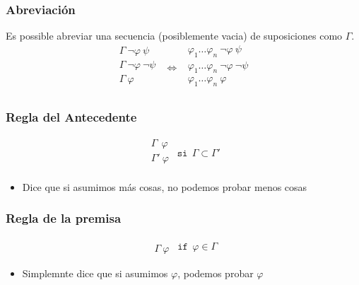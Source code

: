 \documentclass{beamer}
\begin{document}
\begin{frame}
    \frametitle{Abreviaci\'on}
    Es possible abreviar una secuencia (posiblemente vacia) de suposiciones
    como $\Gamma$.\\
    \[
        \begin{array}{l}
            \Gamma\ \neg\varphi\ \psi \\
            \Gamma\ \neg\varphi\ \neg\psi \\
            \hline
            \Gamma\ \varphi \\
        \end{array}
        \ \ \Leftrightarrow\ \ 
        \begin{array}{l}
            \varphi_{1}\ldots\varphi_{n}\ \neg\varphi\ \psi \\
            \varphi_{1}\ldots\varphi_{n}\ \neg\varphi\ \neg\psi \\
            \hline
            \varphi_{1}\ldots\varphi_{n}\ \varphi \\
        \end{array}
    \]
\end{frame}


\begin{frame}
    \frametitle{Regla del Antecedente}
    \[
        \begin{array}{l}
            \Gamma\ \ \varphi \\
            \hline
            \Gamma'\ \varphi \\
        \end{array}
        \ \ \mathtt{si}\ \  \Gamma \subset \Gamma'
    \]
    \begin{itemize}
        \item{Dice que si asumimos m\'as cosas, no podemos probar menos cosas}
    \end{itemize}
\end{frame}

\begin{frame}
    \frametitle{Regla de la premisa}
    \[
        \begin{array}{l}
             \\
            \hline
            \Gamma\ \varphi
        \end{array}
        \ \ \mathtt{if}\ \ \varphi\in\Gamma    
    \]
    \begin{itemize}
        \item{Simplemnte dice que si asumimos $\varphi$, podemos probar $\varphi$}
    \end{itemize}
\end{frame}
\end{document}
